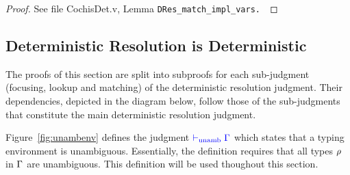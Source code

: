 \begin{proof}
See file CochisDet.v, Lemma \tt{DRes\_match\_impl\_vars}.
\end{proof}

\subsection{Deterministic Resolution is Deterministic}\label{proof:determinism}

\begin{minipage}[t]{\textwidth}
The proofs of this section are split into subproofs for each sub-judgment (focusing, lookup and
matching) of the deterministic resolution judgment. Their dependencies, depicted in the diagram below, follow those of the sub-judgments that constitute the main deterministic resolution
judgment.
\begin{center}
\end{center}\vspace{0.3cm}
\end{minipage}

Figure~\ref{fig:unambenv} defines the judgment ${\color{blue} {\color{blue}  \vdash_{\mathrm{unamb}}\Gamma}}$ which states that a typing environment is unambiguous.
Essentially, the definition requires that all types $\rho$ in $\Gamma$ are unambiguous.
This definition will be used thoughout this section.


